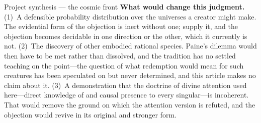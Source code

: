\begin{studybox}{Project synthesis --- the cosmic front}
\textbf{What would change this judgment.} (1)~A defensible probability distribution over the universes a creator might make. The evidential form of the objection is inert without one; supply it, and the objection becomes decidable in one direction or the other, which it currently is not. (2)~The discovery of other embodied rational species. Paine's dilemma would then have to be met rather than dissolved, and the tradition has no settled teaching on the point---the question of what redemption would mean for such creatures has been speculated on but never determined, and this article makes no claim about it. (3)~A demonstration that the doctrine of divine attention used here---direct knowledge of and causal presence to every singular---is incoherent. That would remove the ground on which the attention version is refuted, and the objection would revive in its original and stronger form.
\end{studybox}
